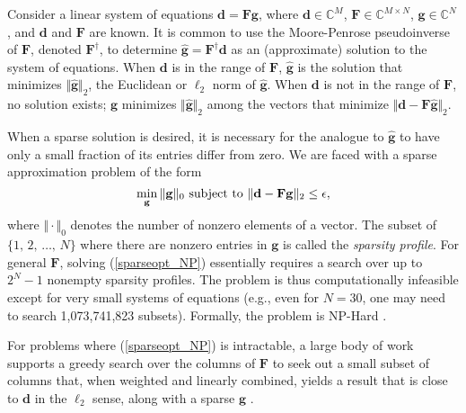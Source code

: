 \documentclass[final]{siamltex}
\newcommand{\field}[1]{\mathbb{#1}}
\newcommand{\la}[1]{\mbox{$\mathbf{#1}$}}  \newcommand{\sst}[1]{\mbox{\scriptsize{#1}}}
\begin{document}
   Consider a linear system of equations $\la{d} = \la{F}\la{g}$,
   where $\la{d} \in \field{C}^{M}$, $\la{F} \in \field{C}^{M \times
   N}$, $\la{g} \in \field{C}^{N}$, and $\la{d}$ and $\la{F}$ are
   known.  It is common to use the Moore-Penrose pseudoinverse of
   $\la{F}$, denoted $\la{F}^\dagger$, to determine $\hat{\la{g}} =
   \la{F}^\dagger \la{d}$ as an (approximate) solution to the system
   of equations.  When $\la{d}$ is in the range of $\la{F}$,
   $\hat{\la{g}}$ is the solution that minimizes $\Vert \hat{\la{g}}
   \Vert_2$, the Euclidean or $\ell_2$ norm of $\hat{\la{g}}$.  When
   $\la{d}$ is not in the range of $\la{F}$, no solution exists;
   $\hat{\la{g}}$ minimizes $\Vert \hat{\la{g}} \Vert_2$ among the
   vectors that minimize $\Vert \la{d} - \la{F}\hat{\la{g}} \Vert_2$.
   
   When a sparse solution is desired, it is necessary for the analogue
   to $\hat{\la{g}}$ to have only a small fraction of its entries
   differ from zero.  We are faced with a sparse approximation problem
   of the form
   \begin{equation}\label{sparseopt_NP}
   \mathop{\mbox{min}}_{\mbox{\scriptsize{\la{g}}}}
                                \Vert \la{g} \Vert _0
                                   \text{  subject to  }
                            \Vert \la{d} - \la{F}\la{g} \Vert_2 \leq \epsilon,
   \end{equation}
   where $\Vert \cdot \Vert_0$ denotes the number of nonzero elements of a
   vector.  The subset of $\{1,\,2,\,\ldots,\,N\}$ where there are
   nonzero entries in \la{g} is called the \emph{sparsity profile}.
   For general $\la{F}$, solving (\ref{sparseopt_NP}) essentially
   requires a search over up to $2^N-1$ nonempty sparsity profiles.
   The problem is thus computationally infeasible except for very
   small systems of equations (e.g., even for $N = 30$, one may need
   to search 1,073,741,823 subsets).  Formally, the problem is
   NP-Hard \cite{Dav1994,Nat1995}.

   For problems where (\ref{sparseopt_NP}) is intractable, a large
   body of work supports a greedy search over the columns of \la{F} to
   seek out a small subset of columns that, when weighted and linearly
   combined, yields a result that is close to \la{d} in the $\ell_2$
   sense, along with a sparse \la{g} \cite{Mal1993, Nat1995, Che1995,
   Dav1997, Cot1999}.
\end{document}
